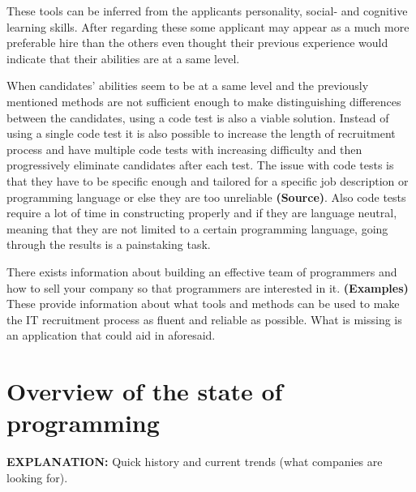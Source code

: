 \documentclass[11pt,a4paper,oneside,article]{memoir}
\begin{document}
These tools can be inferred from the applicants personality, social- and cognitive learning skills. After regarding these some applicant may appear as a much more preferable hire than the others even thought their previous experience would indicate that their abilities are at a same level.

When candidates' abilities seem to be at a same level and the previously mentioned methods are not sufficient enough to make distinguishing differences between the candidates, using a code test is also a viable solution. Instead of using a single code test it is also possible to increase the length of recruitment process and have multiple code tests with increasing difficulty and then progressively eliminate candidates after each test. The issue with code tests is that they have to be specific enough and tailored for a specific job description or programming language or else they are too unreliable \textbf{(Source)}. Also code tests require a lot of time in constructing properly and if they are language neutral, meaning that they are not limited to a certain programming language, going through the results is a painstaking task.



There exists information about building an effective team of programmers and how to sell your company so that programmers are interested in it. \textbf{(Examples)} These provide information about what tools and methods can be used to make the IT recruitment process as fluent and reliable as possible. What is missing is an application that could aid in aforesaid.

\cite{baggelaar:thesis}

\section{Overview of the state of programming}

\textbf{EXPLANATION:} Quick history and current trends (what companies are looking for). %
\end{document}
